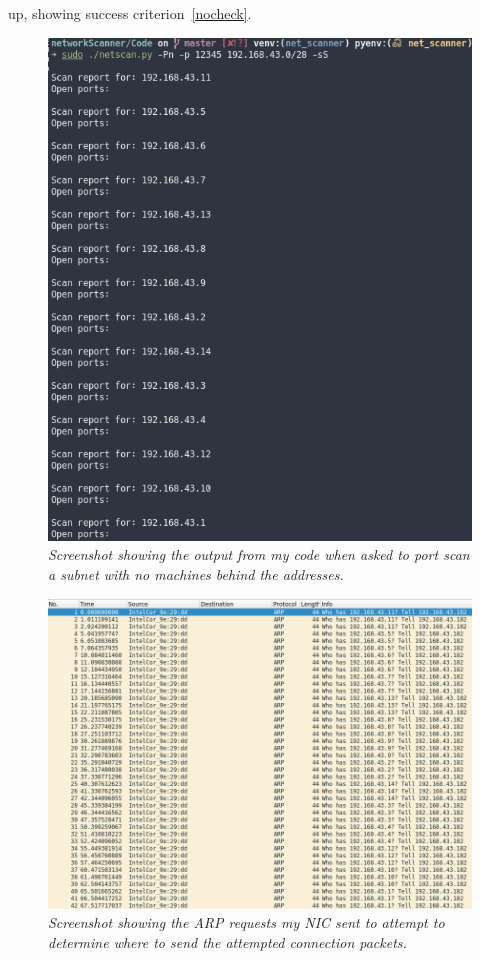 \documentclass[titlepage]{article}
\begin{document}
up, showing success criterion~\ref{nocheck}.
\begin{figure}[H]
  \centering
  \includegraphics[width=\textwidth]{nocheckhostoutput.png}
  \caption{\textit{%
    Screenshot showing the output from my code when asked to port scan a subnet
    with no machines behind the addresses.
}}\label{nocheckoutput}
\end{figure}

\begin{figure}[H]
  \centering
  \includegraphics[width=\textwidth]{nocheckpcap.png}
  \caption{\textit{%
    Screenshot showing the ARP requests my NIC sent to attempt to determine
    where to send the attempted connection packets.
}}\label{nocheckWireshark}
\end{figure}
\end{document}
